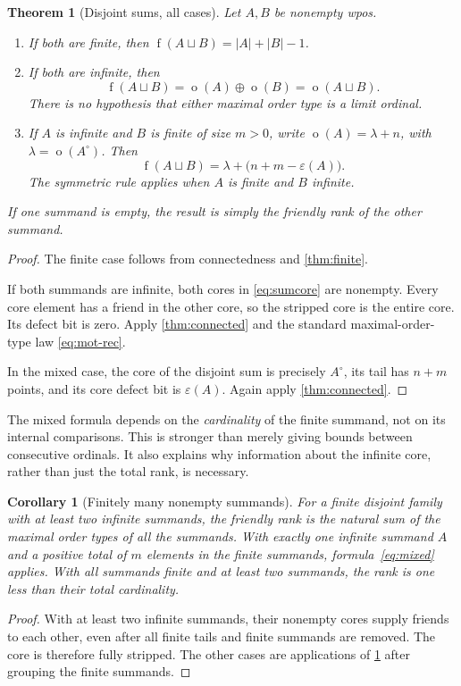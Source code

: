 \documentclass[11pt,a4paper]{article}
\newtheorem{theorem}{Theorem}[section]
\newtheorem{corollary}[corollary]{Corollary}
\theoremstyle{definition}
\theoremstyle{remark}
\DeclareMathOperator{\mot}{o}
\DeclareMathOperator{\fot}{f}
\newcommand{\core}[1]{{#1}^{\circ}}
\newcommand{\ds}{\mathbin{\sqcup}}
\newcommand{\eps}{\varepsilon}
\begin{document}
\begin{theorem}[Disjoint sums, all cases]\label{thm:disjoint}
Let $A,B$ be nonempty wpos.
\begin{enumerate}[label=(\roman*)]
\item If both are finite, then
$\fot(A\ds B)=|A|+|B|-1$.
\item If both are infinite, then
\begin{equation}\label{eq:two-infinite}
\boxed{\fot(A\ds B)=\mot(A)\oplus\mot(B)=\mot(A\ds B).}
\end{equation}
There is no hypothesis that either maximal order type is a limit ordinal.
\item If $A$ is infinite and $B$ is finite of size $m>0$, write
$\mot(A)=\lambda+n$, with $\lambda=\mot(\core{A})$. Then
\begin{equation}\label{eq:mixed}
\boxed{\fot(A\ds B)=\lambda+\bigl(n+m-\eps(A)\bigr).}
\end{equation}
The symmetric rule applies when $A$ is finite and $B$ infinite.
\end{enumerate}
If one summand is empty, the result is simply the friendly rank of the
other summand.
\end{theorem}
\begin{proof}
The finite case follows from connectedness and \cref{thm:finite}.

If both summands are infinite, both cores in \eqref{eq:sumcore} are nonempty.
Every core element has a friend in the other core, so the stripped core is
the entire core. Its defect bit is zero. Apply \cref{thm:connected} and the
standard maximal-order-type law \eqref{eq:mot-rec}.

In the mixed case, the core of the disjoint sum is precisely $\core{A}$,
its tail has $n+m$ points, and its core defect bit is $\eps(A)$. Again apply
\cref{thm:connected}.
\end{proof}

The mixed formula depends on the \emph{cardinality} of the finite summand,
not on its internal comparisons. This is stronger than merely giving bounds
between consecutive ordinals. It also explains why information about the
infinite core, rather than just the total rank, is necessary.

\begin{corollary}[Finitely many nonempty summands]\label{cor:manysums}
For a finite disjoint family with at least two infinite summands, the
friendly rank is the natural sum of the maximal order types of all the
summands. With exactly one infinite summand $A$ and a positive total of
$m$ elements in the finite summands, formula~\eqref{eq:mixed} applies.
With all summands finite and at least two summands, the rank is one less
than their total cardinality.
\end{corollary}
\begin{proof}
With at least two infinite summands, their nonempty cores supply friends
to each other, even after all finite tails and finite summands are removed.
The core is therefore fully stripped. The other cases are applications of
\cref{thm:disjoint} after grouping the finite summands.
\end{proof}
\end{document}
